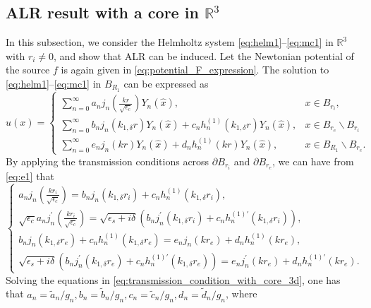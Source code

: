 \documentclass[11pt,reqno,twoside]{amsart}
\theoremstyle{definition}
\theoremstyle{remark}
\numberwithin{equation}{section}
\begin{document}
\subsection{ALR result with a core in $\mathbb{R}^3$}

In this subsection, we consider the Helmholtz system \eqref{eq:helm1}--\eqref{eq:mc1} in $\mathbb{R}^3$ with $r_i\neq 0$, and show that ALR can be induced. Let the Newtonian potential of the source $f$ is again given in \eqref{eq:potential_F_expression}. The solution to \eqref{eq:helm1}--\eqref{eq:mc1} in $B_{R_1}$ can be expressed as
\begin{equation}\label{eq:e1}
  u(x)=\left\{
         \begin{array}{ll}
          {\sum_{n=0}^{\infty} a_n j_n(\frac{kr}{\sqrt{\epsilon_c}}) Y_n(\hat{x})}, & x\in B_{r_i}, \\
          {\sum_{n=0}^{\infty} b_n j_n(k_{1,\delta}r) Y_n(\hat{x}) + c_n h_n^{(1)}(k_{1,\delta}r) Y_n(\hat{x})} , & x\in B_{r_e}\backslash B_{r_i}  \\
          {\sum_{n=0}^{\infty} e_n j_n(kr) Y_n(\hat{x}) + d_n h_n^{(1)}(kr) Y_n(\hat{x})} , & x\in B_{R_1}\backslash B_{r_e}. 
         \end{array}
       \right.
\end{equation}
By applying the transmission conditions across $\partial B_{r_i}$ and $\partial B_{r_e}$, we can have from \eqref{eq:e1} that
\begin{equation}\label{eq:transmission_condition_with_core_3d}
  \left\{
    \begin{array}{ll}
     { a_n j_n(\frac{kr_i}{\sqrt{\epsilon_c}})=b_n j_n(k_{1,\delta}r_i) + c_n h_n^{(1)}(k_{1,\delta}r_i) }, \\
     { \sqrt{\epsilon_c}a_n j_n^{\prime}(\frac{kr_i}{\sqrt{\epsilon_c}})=\sqrt{\epsilon_s+i\delta} \left(b_n j_n^{\prime}(k_{1,\delta}r_i) + c_n  h_n^{(1)\prime}(k_{1,\delta}r_i) \right),} \\
    {  b_n j_n(k_{1,\delta}r_e) + c_n h_n^{(1)}(k_{1,\delta}r_e) =  e_n j_n(kr_e)  + d_n h_n^{(1)}(kr_e),} \\
     { \sqrt{\epsilon_s+i\delta} \left(b_n j_n^{\prime}(k_{1,\delta}r_e) + c_n  h_n^{(1)\prime}(k_{1,\delta}r_e) \right)= e_n j_n^{\prime}(kr_e) + d_n  h_n^{(1)\prime}(kr_e).}
    \end{array}
  \right.
\end{equation}
Solving the equations in \eqref{eq:transmission_condition_with_core_3d}, one has that $ a_n={\tilde{a}_n}/{g_n }, b_n={\tilde{b}_n}/{g_n }, c_n={\tilde{c}_n}/{g_n }, d_n={\tilde{d}_n}/{g_n }$, where
\end{document}
